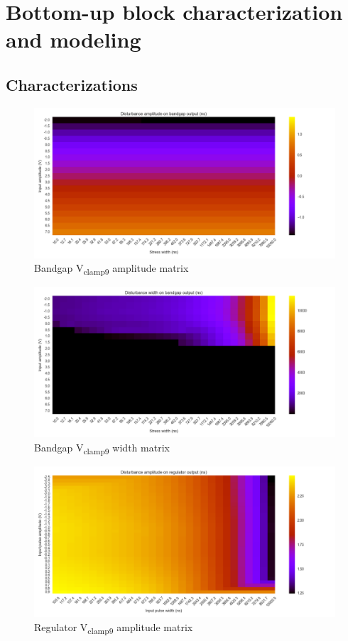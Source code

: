 \chapter{Bottom-up block characterization and modeling}
\section{Characterizations}
\label{apx:block-cz}

\begin{figure}[!h]
  \centering
  \includegraphics[width=\textwidth]{src/4/figures/bandgap_cz_v2_amplitude.png}
  \caption{Bandgap V\textsubscript{clamp9} amplitude matrix}
  \label{fig:bg_amp}
\end{figure}

\begin{figure}[!h]
  \centering
  \includegraphics[width=\textwidth]{src/4/figures/bandgap_cz_v2_width.png}
  \caption{Bandgap V\textsubscript{clamp9} width matrix}
  \label{fig:bg_width}
\end{figure}

\begin{figure}[!h]
  \centering
  \includegraphics[width=\textwidth]{src/4/figures/regulator_cz_v2_amplitude.png}
  \caption{Regulator V\textsubscript{clamp9} amplitude matrix}
  \label{fig:regu_amp}
\end{figure}

